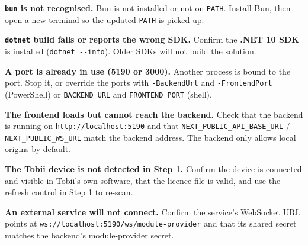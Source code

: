 \textbf{\texttt{bun} is not recognised.}
Bun is not installed or not on \texttt{PATH}. Install Bun, then open a new terminal so the updated \texttt{PATH}
is picked up.

\textbf{\texttt{dotnet} build fails or reports the wrong SDK.}
Confirm the \textbf{.NET 10 SDK} is installed (\texttt{dotnet\ -\/-info}). Older SDKs will not build the solution.

\textbf{A port is already in use (5190 or 3000).}
Another process is bound to the port. Stop it, or override the ports with \texttt{-BackendUrl} and
\texttt{-FrontendPort} (PowerShell) or \texttt{BACKEND\_URL} and \texttt{FRONTEND\_PORT} (shell).

\textbf{The frontend loads but cannot reach the backend.}
Check that the backend is running on \texttt{http://localhost:5190} and that
\texttt{NEXT\_PUBLIC\_API\_BASE\_URL} / \texttt{NEXT\_PUBLIC\_WS\_URL} match the backend address. The backend only
allows local origins by default.

\textbf{The Tobii device is not detected in Step 1.}
Confirm the device is connected and visible in Tobii's own software, that the licence file is
valid, and use the refresh control in Step 1 to re-scan.

\textbf{An external service will not connect.}
Confirm the service's WebSocket URL points at \texttt{ws://localhost:5190/ws/module-provider} and that its
shared secret matches the backend's module-provider secret.
